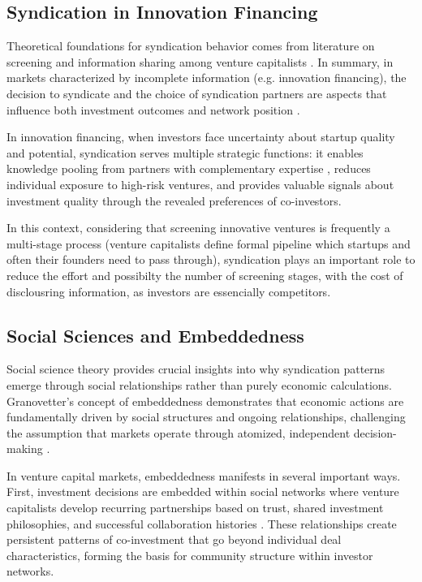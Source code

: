 \subsection{Syndication in Innovation Financing}

Theoretical foundations for syndication behavior comes from literature on screening and information sharing among venture capitalists \cite{Casamatta2007}. In summary, in markets characterized by incomplete information (e.g. innovation financing), the decision to syndicate and the choice of syndication partners are aspects that influence both investment outcomes and network position \cite{Casamatta2007}.

In innovation financing, when investors face uncertainty about startup quality and potential, syndication serves multiple strategic functions: it enables knowledge pooling from partners with complementary expertise \cite{Lerner1994}, reduces individual exposure to high-risk ventures, and provides valuable signals \cite{Spence1981} about investment quality through the revealed preferences of co-investors. 

In this context, considering that screening innovative ventures is frequently a multi-stage process (venture capitalists define formal pipeline which startups and often their founders need to pass through), syndication plays an important role to reduce the effort and possibilty the number of screening stages, with the cost of disclousring information, as investors are essencially competitors.

\subsection{Social Sciences and Embeddedness}

Social science theory provides crucial insights into why syndication patterns emerge through social relationships rather than purely economic calculations. Granovetter's concept of embeddedness demonstrates that economic actions are fundamentally driven by social structures and ongoing relationships, challenging the assumption that markets operate through atomized, independent decision-making \cite{Granovetter1985}.

In venture capital markets, embeddedness manifests in several important ways. First, investment decisions are embedded within social networks where venture capitalists develop recurring partnerships based on trust, shared investment philosophies, and successful collaboration histories \cite{Granovetter1985}. These relationships create persistent patterns of co-investment that go beyond individual deal characteristics, forming the basis for community structure within investor networks.

